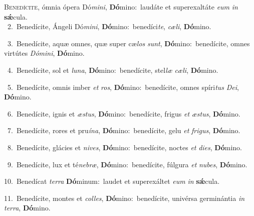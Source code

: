 \lettrine{\initial\textcolor{\initialcolor}{B}}{enedícite,} ómnia ópera Dó\-\textit{mi}\-\textit{ni}, \textbf{Dó}\-mino:~\star laudáte et superexaltáte \textit{e}\-\textit{um} \textit{in} \textbf{sǽ}\-cula.\\
{\numbfont\textcolor{\numbcolor}{~2.}}~Benedícite, Ángeli Dó\-\textit{mi}\-\textit{ni}, \textbf{Dó}\-mino:~\star benedíci\-\textit{te}\-, \textit{cæ}\-\textit{li}, \textbf{Dó}\-mino.\par
{\numbfont\textcolor{\numbcolor}{~3.}}~Benedícite, aquæ omnes, quæ super cæ\textit{los} \textit{sunt}\-, \textbf{Dó}\-mino:~\star benedícite, omnes virtútes \textit{Dó}\-\textit{mi}\textit{ni}, \textbf{Dó}\-mino.\par
{\numbfont\textcolor{\numbcolor}{~4.}}~Benedícite, sol et \textit{lu}\-\textit{na}, \textbf{Dó}\-mino:~\star benedícite, stel\textit{læ} \textit{cæ}\-\textit{li}, \textbf{Dó}\-mino.\par
{\numbfont\textcolor{\numbcolor}{~5.}}~Benedícite, omnis imber \textit{et} \textit{ros}\-, \textbf{Dó}\-mino:~\star benedícite, omnes spíri\textit{tus} \textit{De}\-\textit{i}, \textbf{Dó}\-mino.\par
{\numbfont\textcolor{\numbcolor}{~6.}}~Benedícite, ignis et \textit{æs}\-\textit{tus}, \textbf{Dó}\-mino:~\star benedícite, frigus \textit{et} \textit{æs}\-\textit{tus}, \textbf{Dó}\-mino.\par
{\numbfont\textcolor{\numbcolor}{~7.}}~Benedícite, rores et pru\-\textit{í}\-\textit{na}, \textbf{Dó}\-mino:~\star benedícite, gelu \textit{et} \textit{fri}\-\textit{gus}, \textbf{Dó}\-mino.\par
{\numbfont\textcolor{\numbcolor}{~8.}}~Benedícite, glácies et \textit{ni}\-\textit{ves}, \textbf{Dó}\-mino:~\star benedícite, noctes \textit{et} \textit{di}\-\textit{es}, \textbf{Dó}\-mino.\par
{\numbfont\textcolor{\numbcolor}{~9.}}~Benedícite, lux et té\-\textit{ne}\-\textit{bræ}, \textbf{Dó}\-mino:~\star benedícite, fúlgura \textit{et} \textit{nu}\-\textit{bes}, \textbf{Dó}\-mino.\par
{\numbfont\textcolor{\numbcolor}{10.}}~Benedícat \textit{ter}\-\textit{ra} \textbf{Dó}\-minum:~\star laudet et superexáltet \textit{e}\-\textit{um} \textit{in} \textbf{sǽ}\-cula.\par
{\numbfont\textcolor{\numbcolor}{11.}}~Benedícite, montes et \textit{col}\-\textit{les}, \textbf{Dó}\-mino:~\star benedícite, univérsa germinántia \textit{in} \textit{ter}\-\textit{ra}, \textbf{Dó}\-mino.\par
